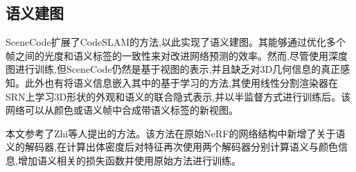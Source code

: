 \subsection{语义建图}
SceneCode\cite{scenecode}扩展了CodeSLAM的方法,以此实现了语义建图。其能够通过优化多个帧之间的光度和语义标签的一致性来对改进网络预测的效率。然而,尽管使用深度图进行训练,但SceneCode仍然是基于视图的表示,并且缺乏对3D几何信息的真正感知。此外也有将语义信息嵌入其中的基于学习的方法\cite{semantic2},其使用线性分割渲染器在SRN上学习3D形状的外观和语义的联合隐式表示,并以半监督方式进行训练后。该网络可以从颜色或语义帧中合成带语义标签的新视图。

本文参考了Zhi等人提出的方法\cite{sem_nerf}。该方法在原始NeRF的网络结构中新增了关于语义的解码器,在计算出体密度后对特征再次使用两个解码器分别计算语义与颜色信息,增加语义相关的损失函数并使用原始方法进行训练。